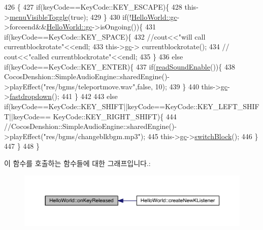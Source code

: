 \begin{DoxyCode}
426                                                                                       \{
427     \textcolor{keywordflow}{if}(keyCode==KeyCode::KEY\_ESCAPE)\{
428         this->\hyperlink{class_hello_world_a38047ef68d46872dd39be5d4cc59ad18}{menuVisibleToggle}(\textcolor{keyword}{true});
429     \}
430     \textcolor{keywordflow}{if}(!\hyperlink{class_hello_world_a547cb213126911d9a7151f8259dc7102}{HelloWorld::gc}->forceend&&\hyperlink{class_hello_world_a547cb213126911d9a7151f8259dc7102}{HelloWorld::gc}->isOngoing())\{
431         \textcolor{keywordflow}{if}(keyCode==KeyCode::KEY\_SPACE)\{
432         \textcolor{comment}{//cout<<"will call currentblockrotate"<<endl;}
433             this->\hyperlink{class_hello_world_a547cb213126911d9a7151f8259dc7102}{gc}-> currentblockrotate();
434        \textcolor{comment}{// cout<<"called currentblockrotate"<<endl;}
435         \}
436         \textcolor{keywordflow}{else} \textcolor{keywordflow}{if}(keyCode==KeyCode::KEY\_ENTER)\{
437             \textcolor{keywordflow}{if}(\hyperlink{class_hello_world_a0f8c9d1b95e03b397e680b9dafb8f3d9}{readSoundEnable}())\{
438             CocosDenshion::SimpleAudioEngine::sharedEngine()->playEffect(\textcolor{stringliteral}{"res/bgms/teleportmove.wav"},\textcolor{keyword}{false},
      10);
439             \}
440             this->\hyperlink{class_hello_world_a547cb213126911d9a7151f8259dc7102}{gc}->\hyperlink{class_tetris_1_1_game_controller_a8d5b65ec7638519a39b4ba8a71e67fff}{fastdropdown}();
441         \}
442         
443         \textcolor{keywordflow}{else} \textcolor{keywordflow}{if}(keyCode==KeyCode::KEY\_SHIFT||keyCode==KeyCode::KEY\_LEFT\_SHIFT||keyCode==
      KeyCode::KEY\_RIGHT\_SHIFT)\{
444             \textcolor{comment}{//CocosDenshion::SimpleAudioEngine::sharedEngine()->playEffect("res/bgms/changeblkbgm.mp3");}
445             this->\hyperlink{class_hello_world_a547cb213126911d9a7151f8259dc7102}{gc}->\hyperlink{class_tetris_1_1_game_controller_ad203991dc134e2ea36c9c40326da55c1}{switchBlock}();
446         \}
447     \}
448 \}
\end{DoxyCode}
이 함수를 호출하는 함수들에 대한 그래프입니다.\+:
\nopagebreak
\begin{figure}[H]
\begin{center}
\leavevmode
\includegraphics[width=350pt]{d9/d98/class_hello_world_acb7b8934f4697e752182a650a1dc7c3a_icgraph}
\end{center}
\end{figure}
\mbox{\label{class_hello_world_af72bece97d2fe997936df92723636298}} 
